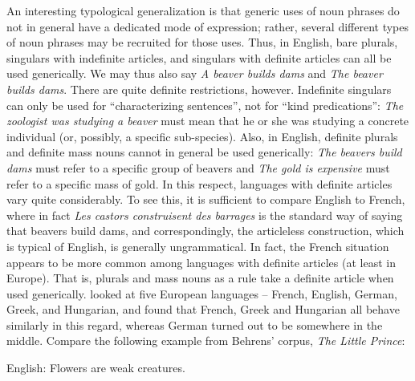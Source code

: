 \begin{styleBodytextC}
An interesting typological generalization is that generic uses of noun phrases do not in general have a dedicated mode of expression; rather, several different types of noun phrases may be recruited for those uses. Thus, in English, bare plurals, singulars with indefinite articles, and singulars with definite articles can all be used generically. We may thus also say \textit{A beaver builds dams} and \textit{The beaver builds dams}. There are quite definite restrictions, however. Indefinite singulars can only be used for “characterizing sentences”, not for “kind predications”: \textit{The zoologist was studying a beaver }must mean that he or she was studying a concrete individual (or, possibly, a specific sub-species). Also, in English, definite plurals and definite mass nouns cannot in\textbf{ }general be used generically: \textit{The beavers build dams} must refer to a specific group of beavers and \textit{The gold is expensive} must refer to a specific mass of gold. In this respect, languages with definite articles vary quite considerably. To see this, it is sufficient to compare English to French, where in fact \textit{Les castors construisent des barrages} is the standard way of saying that beavers build dams, and correspondingly, the articleless construction, which is typical of English, is generally ungrammatical. In fact, the French situation appears to be more common among languages with definite articles (at least in Europe). That is, plurals and mass nouns as a rule take a definite article when used generically. \citet{Behrens2005} looked at five European languages – French, English, German, Greek, and Hungarian, and found that French, Greek and Hungarian all behave similarly in this regard, whereas German turned out to be somewhere in the middle. Compare the following example from Behrens’ corpus, \textit{The Little Prince}:

\end{styleBodytextC}

\begin{listWWNumileveli}
\item 

\end{listWWNumileveli}

\begin{listWWNumxvileveli}
\item 

\begin{styleExLtrTbl}
\label{bkm:Ref135628619}English: Flowers are weak creatures.

\end{styleExLtrTbl}

\end{listWWNumxvileveli}

